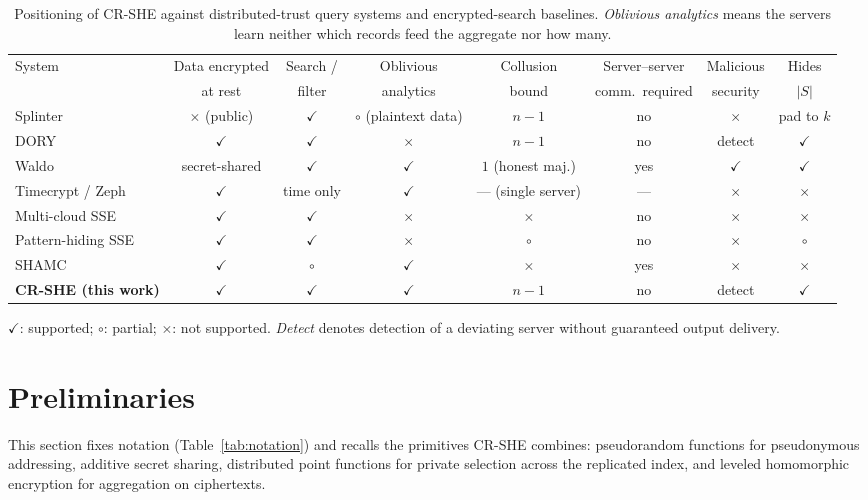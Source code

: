 \documentclass[journal]{IEEEtran}
\begin{document}
\begin{table}[t]
\centering
\caption{Positioning of CR-SHE against distributed-trust query systems and encrypted-search baselines. \emph{Oblivious analytics} means the servers learn neither which records feed the aggregate nor how many.}
\label{tab:compare}
\begin{tabular*}{\textwidth}{@{\extracolsep{\fill}}lccccccc@{}}
\toprule
System & Data encrypted & Search / & Oblivious & Collusion & Server--server & Malicious & Hides \\
 & at rest & filter & analytics & bound & comm.\ required & security & $|S|$ \\
\midrule
Splinter~\cite{splinter} & $\times$ (public) & $\checkmark$ & $\circ$ (plaintext data) & $n-1$ & no & $\times$ & pad to $k$ \\
DORY~\cite{dory} & $\checkmark$ & $\checkmark$ & $\times$ & $n-1$ & no & detect & $\checkmark$ \\
Waldo~\cite{waldo} & secret-shared & $\checkmark$ & $\checkmark$ & $1$ (honest maj.) & yes & $\checkmark$ & $\checkmark$ \\
Timecrypt / Zeph~\cite{timecrypt,zeph} & $\checkmark$ & time only & $\checkmark$ & --- (single server) & --- & $\times$ & $\times$ \\
Multi-cloud SSE~\cite{xu2021privacy} & $\checkmark$ & $\checkmark$ & $\times$ & $\times$ & no & $\times$ & $\times$ \\
Pattern-hiding SSE~\cite{xu2023symmetric} & $\checkmark$ & $\checkmark$ & $\times$ & $\circ$ & no & $\times$ & $\circ$ \\
SHAMC~\cite{wang2020shamc} & $\checkmark$ & $\circ$ & $\checkmark$ & $\times$ & yes & $\times$ & $\times$ \\
\midrule
\textbf{CR-SHE (this work)} & $\checkmark$ & $\checkmark$ & $\checkmark$ & $n-1$ & no & detect & $\checkmark$ \\
\bottomrule
\end{tabular*}
\vspace{3pt}
\begin{flushleft}
\footnotesize
$\checkmark$: supported; $\circ$: partial; $\times$: not supported. \emph{Detect} denotes detection of a deviating server without guaranteed output delivery.
\end{flushleft}
\end{table}

\section{Preliminaries}
\label{sec:prelim}
This section fixes notation (Table~\ref{tab:notation}) and recalls the primitives CR-SHE combines: pseudorandom functions for pseudonymous addressing, additive secret sharing, distributed point functions for private selection across the replicated index, and leveled homomorphic encryption for aggregation on ciphertexts.
\end{document}
